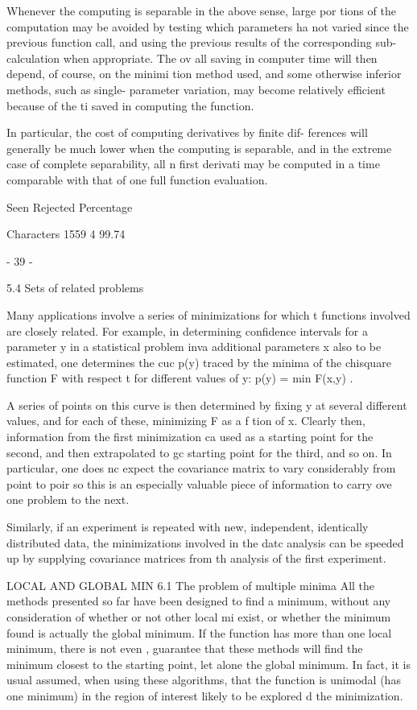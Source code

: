      Whenever the computing is separable in the above sense, large por
tions of the computation may be avoided by testing which parameters ha
not varied since the previous function call, and using the previous
results of the corresponding sub-calculation when appropriate.  The ov
all saving in computer time will then depend, of course, on the minimi
tion method used, and some otherwise inferior methods, such as single-
parameter variation, may become relatively efficient because of the ti
saved in computing the function.
 
     In particular, the cost of computing derivatives by finite dif-
ferences will generally be much lower when the computing is separable,
and in the extreme case of complete separability, all n first derivati
may be computed in a time comparable with that of one full function
evaluation.
 
                 Seen Rejected  Percentage
 
Characters       1559        4   99.74
 
                                - 39 -
 
 
5.4  Sets of related problems
 
     Many applications involve a series of minimizations for which t
functions involved are closely related.  For example, in determining
confidence intervals for a parameter y in a statistical problem inva
additional parameters x also to be estimated, one determines the cuc
p(y) traced by the minima of the chisquare function F with respect t
for different values of y:
p(y) = min F(x,y) .
 
 
A series of points on this curve is then determined by fixing y at
several different values, and for each of these, minimizing F as a f
tion of x.  Clearly then, information from the first minimization ca
used as a starting point for the second, and then extrapolated to gc
starting point for the third, and so on.  In particular, one does nc
expect the covariance matrix to vary considerably from point to poir
so this is an especially valuable piece of information to carry ove
one problem to the next.
 
     Similarly, if an experiment is repeated with new, independent,
identically distributed data, the minimizations involved in the datc
analysis can be speeded up by supplying covariance matrices from th
analysis of the first experiment.
 
 
 
LOCAL AND GLOBAL MIN
6.1  The problem of multiple minima
     All the methods presented so far have been designed to find a
minimum, without any consideration of whether or not other local mi
exist, or whether the minimum found is actually the global minimum.
If the function has more than one local minimum, there is not even ,
guarantee that these methods will find the minimum closest to the
starting point, let alone the global minimum.  In fact, it is usual
assumed, when using these algorithms, that the function is unimodal
(has one minimum) in the region of interest likely to be explored d
the minimization.
 
